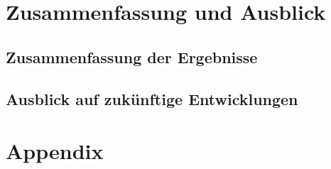 \documentclass[
	a4paper,
	12pt,
	bibtotoc,
	listof=totoc,
	titlepage
]{scrartcl}
\begin{document}
\section{Zusammenfassung und Ausblick}
\subsection{Zusammenfassung der Ergebnisse}
\subsection{Ausblick auf zukünftige Entwicklungen}

\newpage
\appendix
\section{Appendix}

\pagebreak
\clearpage
\printbibliography

\clearpage
\listoffigures

\clearpage
\listoftables

\clearpage
\lstlistoflistings

\clearpage

\end{document}
